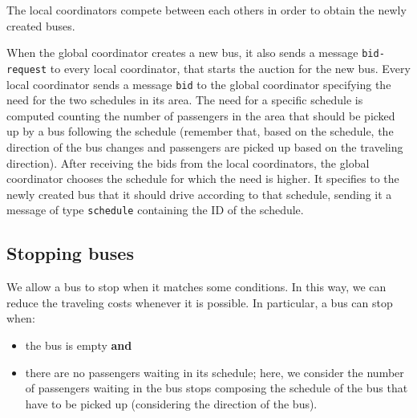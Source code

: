 The local coordinators compete between each others in order to obtain the newly created buses.

When the global coordinator creates a new bus, it also sends a message \texttt{bid-request} to every local coordinator, that starts the auction for the new bus. Every local coordinator sends a message \texttt{bid} to the global coordinator specifying the need for the two schedules in its area. The need for a specific schedule is computed counting the number of passengers in the area that should be picked up by a bus following the schedule (remember that, based on the schedule, the direction of the bus changes and passengers are picked up based on the traveling direction). After receiving the bids from the local coordinators, the global coordinator chooses the schedule for which the need is higher. It specifies to the newly created bus that it should drive according to that schedule, sending it a message of type \texttt{schedule} containing the ID of the schedule.

\subsection{Stopping buses}
\label{sec:stop}

We allow a bus to stop when it matches some conditions. In this way, we can reduce the traveling costs whenever it is possible. In particular, a bus can stop when:

\begin{itemize}
\item the bus is empty \textbf{and}
\item there are no passengers waiting in its schedule; here, we consider the number of passengers waiting in the bus stops composing the schedule of the bus that have to be picked up (considering the direction of the bus).
\end{itemize}
